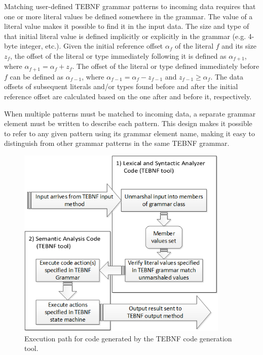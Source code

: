 \indent
Matching user-defined TEBNF grammar patterns to incoming data requires that one or more literal values be defined somewhere in the grammar.  The value of a literal value makes it possible to find it in the input data.  The size and type of that initial literal value is defined implicitly or explicitly in the grammar (e.g. 4-byte integer, etc.).  Given the initial reference offset $ \alpha_f $ of the literal $ f $ and its size $ z_f $, the offset of the literal or type immediately following it is defined as $ \alpha_{f+1} $, where $ \alpha_{f+1} = \alpha_f + z_f $.  The offset of the literal or type defined immediately before $ f $ can be defined as $ \alpha_{f-1} $, where $ \alpha_{f-1} = \alpha_f {-} z_{f-1} $ and $ z_{f-1} \geq \alpha_f $.  The data offsets of subsequent literals and/or types found before and after the initial reference offset are calculated based on the one after and before it, respectively.

\indent
When multiple patterns must be matched to incoming data, a separate grammar element must be written to describe each pattern.  This design makes it possible to refer to any given pattern using its grammar element name, making it easy to distinguish from other grammar patterns in the same TEBNF grammar.

\begin{figure}[htbp]
\centering
\includegraphics[width=0.9\textwidth]{figures/GeneratedCodeExecutionPath.png}
\caption{Execution path for code generated by the TEBNF code generation tool.}
\label{fig:GeneratedCodeExecutionPath}
\end{figure}

